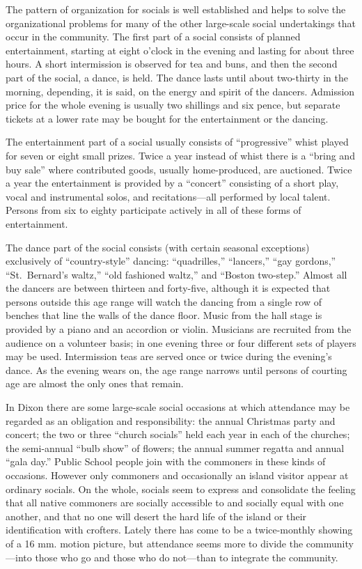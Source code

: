 \documentclass[twoside,symmetric,nobib,justified]{tufte-book}
\begin{document}
The pattern of organization for socials is well established and helps to
solve the organizational problems for many of the other large-scale
social undertakings that occur in the community. The first part of a
social consists of planned entertainment, starting at eight o'clock in
the evening and lasting for about three hours. A short intermission is
observed for tea and buns, and then the second part of the social, a
dance, is held. The dance lasts until about two-thirty in the morning,
depending, it is said, on the energy and spirit of the dancers.
Admission price for the whole evening is usually two shillings and six
pence, but separate tickets at a lower rate may be bought for the
entertainment or the dancing.

The entertainment part of a social usually consists of ``progressive''
whist played for seven or eight small prizes. Twice a year instead of
whist there is a ``bring and buy sale'' where contributed goods, usually
home-produced, are auctioned. Twice a year the entertainment is provided
by a ``concert'' consisting of a short play, vocal and instrumental
solos, and recitations---all performed by local talent. Persons from six
to eighty participate actively in all of these forms of entertainment.

The dance part of the social consists (with certain seasonal exceptions)
exclusively of ``country-style'' dancing: ``quadrilles,'' ``lancers,''
``gay gordons,'' ``St.~Bernard's waltz,'' ``old fashioned waltz,'' and
``Boston two-step.'' Almost all the dancers are between thirteen and
forty-five, although it is expected that persons outside this age range
will watch the dancing from a single row of benches that line the walls
of the dance floor. Music from the hall stage is provided by a piano and
an accordion or violin. Musicians are recruited from the audience on a
volunteer basis; in one evening three or four different sets of players
may be used. Intermission teas are served once or twice during the
evening's dance. As the evening wears on, the age range narrows until
persons of courting age are almost the only ones that remain.

In Dixon there are some large-scale social occasions at which attendance
may be regarded as an obligation and responsibility: the annual
Christmas party and concert; the two or three ``church socials'' held
each year in each of the churches; the semi-annual ``bulb show'' of
flowers; the annual summer regatta and annual ``gala day.'' Public
School people join with the commoners in these kinds of occasions.
However only commoners and occasionally an island visitor appear at
ordinary socials. On the whole, socials seem to express and consolidate
the feeling that all native commoners are socially accessible to and
socially equal with one another, and that no one will desert the hard
life of the island or their identification with crofters. Lately there
has come to be a twice-monthly showing of a 16 mm. motion picture, but
attendance seems more to divide the community---into those who go and
those who do not---than to integrate the community.
\end{document}
